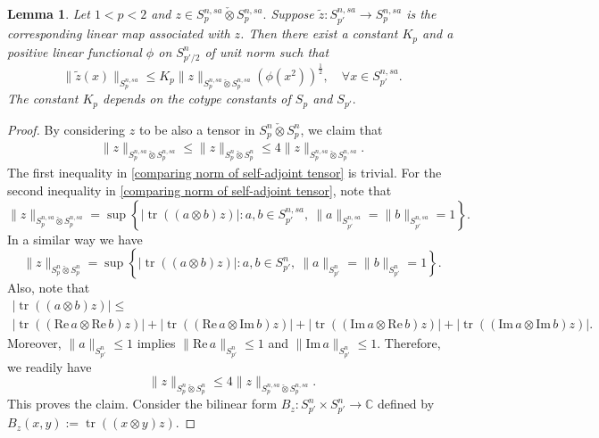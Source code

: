 \documentclass[a4paper,oneside,11pt, reqno]{amsart}
\numberwithin{equation}{section}
\newtheorem{lemma}[theorem]{Lemma}
\theoremstyle{plain}
\begin{document}
\begin{lemma}\label{applyncLpGT}
Let $1<p<2$ and $z\in S_p^{n,sa}\check{\otimes}S_p^{n,sa}.$ Suppose  $\widetilde{z}:S_{p'}^{n,sa}\to S_p^{n,sa}$ is the corresponding linear map associated with $z$. Then there exist a constant $K_p$ and a positive linear functional $\phi$ on $S_{p'/2}^n$ of unit norm such that 
\[\|\widetilde{z}(x)\|_{S_p^{n,sa}}\leqslant K_p\|z\|_{S_p^{n,sa}\check{\otimes}S_p^{n,sa}}(\phi(x^2))^{\frac{1}{2}}, \quad \forall x\in S_{p'}^{n,sa}.\] 
The constant $K_p$ depends on the cotype constants of $S_{p}$ and $S_{p'}.$
\end{lemma}
\begin{proof}
By considering $z$ to be also a tensor in $S_p^n\check{\otimes}S_p^n$, we claim that 
\begin{eqnarray}\label{comparing norm of self-adjoint tensor}
    \|z\|_{S_p^{n,sa}\check{\otimes}S_p^{n,sa}}\leqslant \|z\|_{S_p^{n}\check{\otimes}S_p^{n}}\leqslant 4\|z\|_{S_p^{n,{sa}}\check{\otimes}S_p^{n,sa}}.
\end{eqnarray}
The first inequality in \eqref{comparing norm of self-adjoint tensor} is trivial. For the second inequality in \eqref{comparing norm of self-adjoint tensor}, note that \[\|z\|_{S_p^{n,{sa}}\check{\otimes}S_p^{n,sa}}=\sup\left\{|\operatorname{tr}((a\otimes b)z)|:a,b\in S_{p'}^{n,sa},\ \|a\|_{S_{p'}^{n, sa}}=\|b\|_{S_{p'}^{n, sa}}=1\right\}.\] 
In a similar way we have
\[\|z\|_{S_p^{n}\check{\otimes}S_p^{n}}=\sup\left\{|\operatorname{tr}((a\otimes b)z)|:a,b\in S_{p'}^{n},\ \|a\|_{S_{p'}^{n}}=\|b\|_{S_{p'}^{n}}=1\right\}.\]
Also,  note that %
\begin{multline*}
|\operatorname{tr}((a\otimes b)z)|\leqslant \\|\operatorname{tr}((\text{Re}\, a\otimes\text{Re}\, b)z)|+|\operatorname{tr}((\text{Re}\, a\otimes\text{Im}\, b)z)|+|\operatorname{tr}((\text{Im}\, a\otimes\text{Re}\,b)z)|+|\operatorname{tr}((\text{Im}\, a\otimes\text{Im}\, b)z)|.
\end{multline*}
 Moreover, $\|a\|_{S_{p'}^n}\leqslant 1$ implies $\|\text{Re}\, a\|_{S_{p'}^n}\leqslant 1$ and $\|\text{Im}\,a\|_{S_{p'}^n}\leqslant 1.$ Therefore, we readily have 
\[\|z\|_{S_p^{n}\check{\otimes}S_p^{n}}\leqslant 4\|z\|_{S_p^{n,{sa}}\check{\otimes}S_p^{n,sa}}.\] 
This proves the claim. 
Consider the bilinear form $B_z:S_{p'}^n\times S_{p'}^{n}\to\mathbb C$ defined by  $B_z(x,y):=\operatorname{tr}((x\otimes y)z).$ 

\end{proof}
\end{document}
